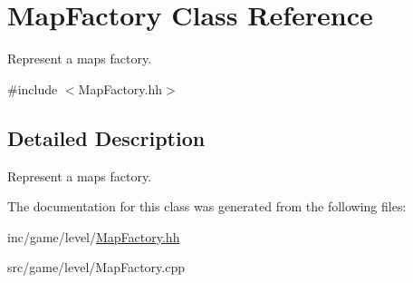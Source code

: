 \hypertarget{classMapFactory}{}\section{Map\+Factory Class Reference}
\label{classMapFactory}


Represent a maps\textquotesingle{} factory.  




{\ttfamily \#include $<$Map\+Factory.\+hh$>$}



\subsection{Detailed Description}
Represent a maps\textquotesingle{} factory. 

The documentation for this class was generated from the following files\+:\begin{DoxyCompactItemize}
\item 
inc/game/level/\hyperlink{MapFactory_8hh}{Map\+Factory.\+hh}\item 
src/game/level/Map\+Factory.\+cpp\end{DoxyCompactItemize}
